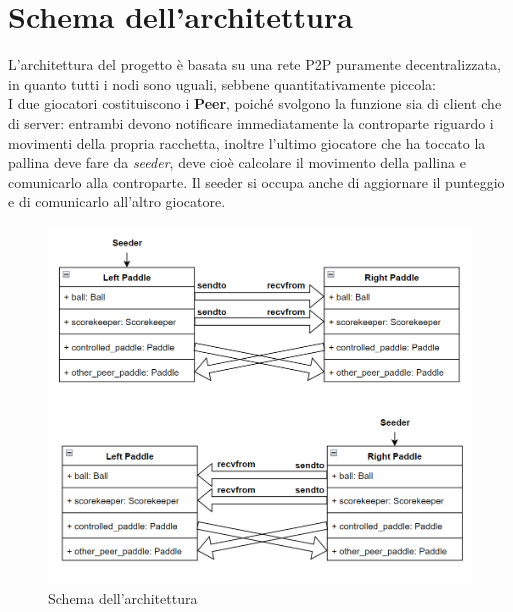 
\newpage
\thispagestyle{headings}
\section{Schema dell'architettura}\label{sec:Schema}
L'architettura del progetto è basata su una rete P2P puramente decentralizzata, in quanto
tutti i nodi sono uguali, sebbene quantitativamente piccola: \\
I due giocatori costituiscono i \textbf{Peer}, poiché svolgono la funzione sia di
client che di server: entrambi devono notificare immediatamente la controparte riguardo
i movimenti della propria racchetta, inoltre l'ultimo giocatore che ha toccato la pallina deve fare
da \textit{seeder}, deve cioè calcolare il movimento della pallina e comunicarlo alla controparte.
Il seeder si occupa anche di aggiornare il punteggio e di comunicarlo all'altro giocatore.

\begin{figure}
    \centering
    \includegraphics[scale=0.5]{img/schema}
    \caption{Schema dell'architettura}
    \label{fig:schema}
\end{figure}

